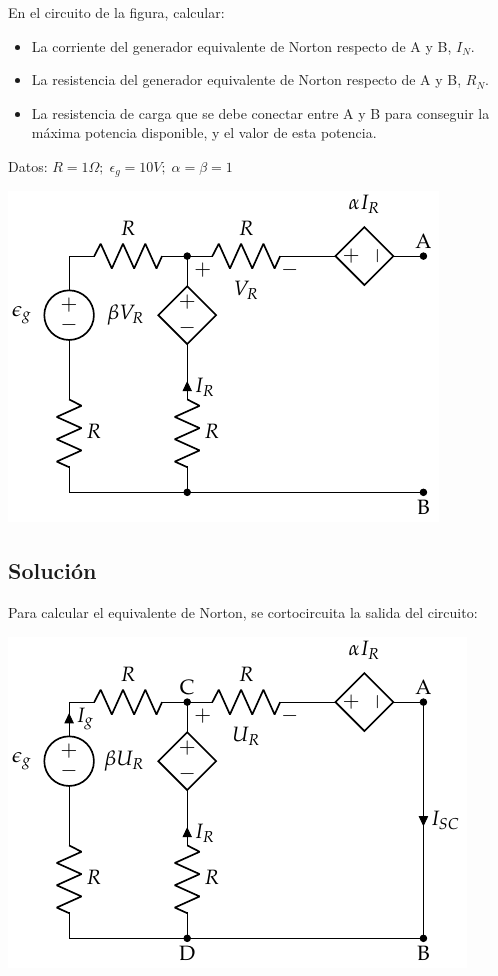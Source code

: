 En el circuito de la figura, calcular:
\begin{itemize}
\item La corriente del generador equivalente de Norton respecto de A y
  B, $I_N$.
\item La resistencia del generador equivalente de Norton respecto de A
  y B, $R_N$.
\item La resistencia de carga que se debe conectar entre A y B para
  conseguir la máxima potencia disponible, y el valor de esta
  potencia.
\end{itemize}

Datos: $R = {1}{\Omega};\; \epsilon_g = {10}{V};\; \alpha = \beta = 1$

\begin{center}
  \includegraphics{figuras/norton.pdf}
\end{center}

\subsection*{Solución}
Para calcular el equivalente de Norton, se cortocircuita la salida del
circuito:
\begin{center}
  \includegraphics{figuras/norton_corto.pdf}
\end{center}

